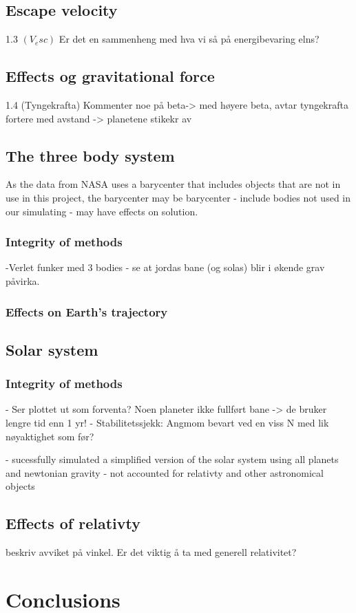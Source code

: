 \documentclass[%
oneside,                 %
final,                   %
10pt]{article}
\begin{document}
 
\subsection{Escape velocity}
1.3 $(V_esc)$ Er det en sammenheng med hva vi så på energibevaring elns? 
\subsection{Effects og gravitational force}
1.4 (Tyngekrafta) Kommenter noe på beta-> med høyere beta, avtar tyngekrafta fortere med avstand -> planetene stikekr av

\subsection{The three body system}
\label{subsec:Discofres:3B}
As the data from NASA uses a barycenter that includes objects that are not in use in this project, the barycenter may be 
barycenter - include bodies not used in our simulating - may have effects on solution.
\subsubsection{Integrity of methods}
-Verlet funker med 3 bodies
- se at jordas bane (og solas) blir i økende grav påvirka.
\subsubsection{Effects on Earth's trajectory}

\subsection{Solar system}
\subsubsection{Integrity of methods}
- Ser plottet ut som forventa? Noen planeter ikke fullført bane -> de bruker lengre tid enn 1 yr!
- Stabilitetssjekk: Angmom bevart ved en viss N med lik nøyaktighet som før?

- sucessfully simulated a simplified version of the solar system using all planets and newtonian gravity - not accounted for relativty and other astronomical objects 
\subsection{Effects of relativty}
beskriv avviket på vinkel. Er det viktig å ta med generell relativitet?
\section{Conclusions}



\end{document}

